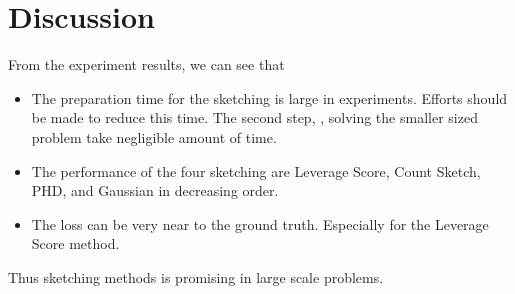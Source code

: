 \section{Discussion}

From the experiment results,
we can see that
\begin{itemize}
    \item The preparation time for the sketching is large in
    experiments. Efforts should be made to reduce this time.
    The second step, \ie, solving the smaller sized problem
    take negligible amount of time.
    \item The performance of the four sketching are
    Leverage Score, Count Sketch, PHD, and Gaussian
    in decreasing order.
    \item The loss can be very near to the ground truth.
    Especially for the Leverage Score method.
\end{itemize}
Thus sketching methods is promising in large scale problems.
